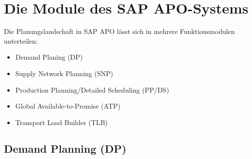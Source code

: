 \chapter{Die Module des SAP APO-Systems}
Die Planungslandschaft in SAP APO lässt sich in mehrere Funktionsmodulen unterteilen:
\begin{itemize}
	\item Demand Planing (DP)
	\item Supply Network Planning (SNP)
	\item Production Planning/Detailed Scheduling (PP/DS)
	\item Global Available-to-Promise (ATP)
	\item Transport Load Builder (TLB)
\end{itemize}

\section{Demand Planning (DP)}

